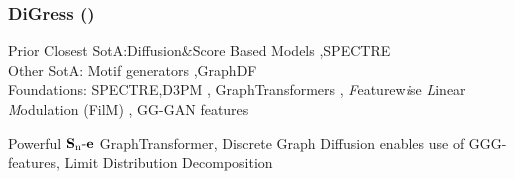 \documentclass[./presentation.tex]{subfiles}
\begin{document}
\begin{frame}[t,label=digress]
  \frametitle{DiGress (\cite{vignacDiGressDiscreteDenoising2023b})}
  \vspace{-1cm}
\footnotesize
\begin{priorart}
{\footnotesize
    Prior Closest SotA:Diffusion\&Score Based Models \citep{niuPermutationInvariantGraph2020b,songGenerativeModelingEstimating2019b},SPECTRE \citep{martinkusSPECTRESpectralConditioning2022b}\\
    Other SotA: Motif generators \citep{maziarzLearningExtendMolecular2021},GraphDF\citep{luoGraphDFDiscreteFlow2021d}
\\
Foundations: SPECTRE,D3PM \citep{austinStructuredDenoisingDiffusion2021e}, GraphTransformers \citep{vaswaniAttentionAllYou2017c,yunGraphTransformerNetworks2019b}, \textit{F}eaturew\textit{i}se \textit{L}inear \textit{M}odulation (FilM) \citep{perezFiLMVisualReasoning2018b}, GG-GAN features
 }
  \end{priorart}
  \begin{contributions}
    Powerful $\operatorname{\mathbf{S}_n\mathbf{-e}}$ GraphTransformer, Discrete Graph Diffusion enables use of GGG-features, Limit Distribution Decomposition
  \end{contributions}
%
  
\end{frame}
\end{document}
